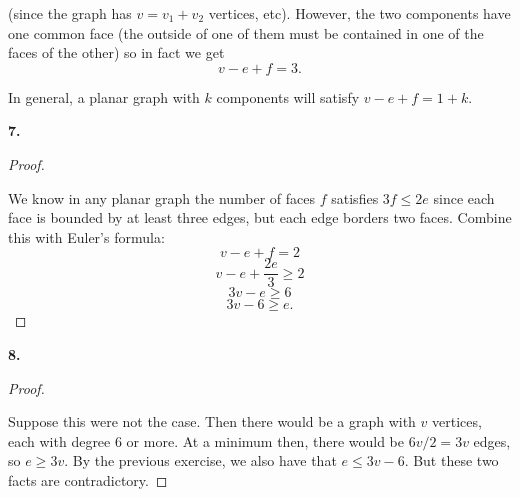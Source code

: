 \documentclass[10pt,]{book}
\theoremstyle{plain}
\theoremstyle{definition}
\theoremstyle{definition}
\theoremstyle{definition}
\numberwithin{equation}{chapter}
\begin{document}
(since the graph has \(v = v_1 + v_2\) vertices, etc). However, the two components have one common face (the outside of one of them must be contained in one of the faces of the other) so in fact we get
\begin{equation*}
  v - e + f = 3.
\end{equation*}
%
\par

In general, a planar graph with \(k\) components will satisfy \(v - e + f = 1 + k\).
%
\par\smallskip
\noindent\textbf{7.}\quad{}\begin{proof}\hypertarget{proof-59}{}

We know in any planar graph the number of faces \(f\) satisfies \(3f \le 2e\) since each face is bounded by at least three edges, but each edge borders two faces. Combine this with Euler's formula:
\begin{equation*}
  v - e + f = 2
\end{equation*}
%
\begin{equation*}
  v - e + \frac{2e}{3} \ge 2
\end{equation*}\begin{equation*}
  3v - e \ge 6
\end{equation*}\begin{equation*}
  3v - 6 \ge e.
\end{equation*}\end{proof}
\par\smallskip
\noindent\textbf{8.}\quad{}\begin{proof}\hypertarget{proof-60}{}

Suppose this were not the case. Then there would be a graph with \(v\) vertices, each with degree 6 or more. At a minimum then, there would be \(6v/2 = 3v\) edges, so \(e \ge 3v\). By the previous exercise, we also have that \(e \le 3v - 6\). But these two facts are contradictory.
%
\end{proof}
\par\smallskip
\end{document}
